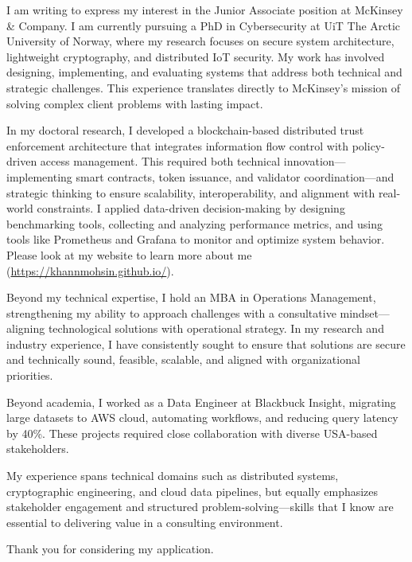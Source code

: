 I am writing to express my interest in the Junior Associate position at McKinsey \& Company. I am currently pursuing a PhD in Cybersecurity at UiT The Arctic University of Norway, where my research focuses on secure system architecture, lightweight cryptography, and distributed IoT security. My work has involved designing, implementing, and evaluating systems that address both technical and strategic challenges. This experience translates directly to McKinsey’s mission of solving complex client problems with lasting impact.

In my doctoral research, I developed a blockchain-based distributed trust enforcement architecture that integrates information flow control with policy-driven access management. This required both technical innovation—implementing smart contracts, token issuance, and validator coordination—and strategic thinking to ensure scalability, interoperability, and alignment with real-world constraints. I applied data-driven decision-making by designing benchmarking tools, collecting and analyzing performance metrics, and using tools like Prometheus and Grafana to monitor and optimize system behavior. Please look at my website to learn more about me (\url{https://khannmohsin.github.io/}). 

Beyond my technical expertise, I hold an MBA in Operations Management, strengthening my ability to approach challenges with a consultative mindset—aligning technological solutions with operational strategy. In my research and industry experience, I have consistently sought to ensure that solutions are secure and technically sound, feasible, scalable, and aligned with organizational priorities.

Beyond academia, I worked as a Data Engineer at Blackbuck Insight, migrating large datasets to AWS cloud, automating workflows, and reducing query latency by 40\%. These projects required close collaboration with diverse USA-based stakeholders.

My experience spans technical domains such as distributed systems, cryptographic engineering, and cloud data pipelines, but equally emphasizes stakeholder engagement and structured problem-solving—skills that I know are essential to delivering value in a consulting environment.

Thank you for considering my application.